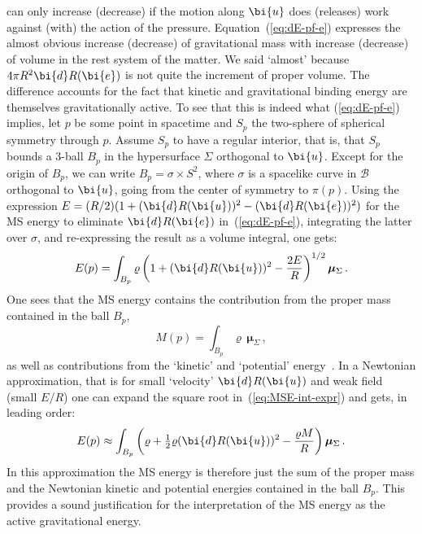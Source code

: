 \documentclass
[rmp,aps,twocolumn,showpacs,preprintnumbers,amsmath,amssymb]{revtex4}
\theoremstyle{plain}
\theoremstyle{definition}
\theoremstyle{remark}
\newcommand{\ed}{\bi{d}}                      %
\newcommand{\B}{\mathcal{B}}                      %
\newcommand{\Stwo}{{S^2}}                         %
\newcommand{\be}{\bi{e}}
\newcommand{\bu}{\bi{u}}
\newcommand{\bmu}{\boldsymbol{\mu}}
\begin{document}
can only increase (decrease) if the motion along $\bu$ does (releases) work 
against (with) the action of the pressure. Equation~(\ref{eq:dE-pf-e}) 
expresses the almost obvious increase (decrease) of gravitational mass 
with increase (decrease) of volume in the rest system of the matter. 
We said `almost' because $4\pi R^2\ed R(\be)$ is not quite the increment 
of proper volume. The difference accounts for the fact that kinetic 
and gravitational binding energy are themselves gravitationally active. 
To see that this is indeed what (\ref{eq:dE-pf-e}) implies, let $p$ 
be some point in spacetime and $S_p$ the two-sphere of spherical symmetry 
through $p$. Assume $S_p$ to have a regular interior, that is, that 
$S_p$ bounds a 3-ball $B_p$ in the hypersurface $\Sigma$ orthogonal 
to $\bu$. Except for the origin of $B_p$, we can write 
$B_p=\sigma\times\Stwo$, where $\sigma$ is a spacelike curve in $\B$ 
orthogonal to $\bu$, going from the center of symmetry to $\pi(p)$. 
Using the expression $E=(R/2)(1 + (\ed R(\bu))^2 - (\ed R(\be))^2)$ 
for the MS energy to eliminate $\ed R(\be)$ in~(\ref{eq:dE-pf-e}), 
integrating the latter over $\sigma$, and re-expressing the result 
as a volume integral, one gets: 
%
\begin{equation}\label{eq:MSE-int-expr}
  E(p) = \int_{B_p} \varrho
         \left( 1 + (\ed R(\bu))^2 - \frac{2E}{R} \right)^{1/2} \bmu_\Sigma\,.
\end{equation}
%
One sees that the MS energy contains the contribution from the 
proper mass contained in the ball $B_p$, 
%
\begin{equation}\label{eq:proper-mass}
  M(p) = \int_{B_p} \varrho\, \bmu_\Sigma \,,
\end{equation}
%
as well as contributions from the `kinetic' and `potential' 
energy~\cite{Misner.Sharp:1964,Hayward:1996}. In a Newtonian approximation, 
that is for small `velocity' $\ed R(\bu)$ and weak field (small $E/R$) one 
can expand the square root in~(\ref{eq:MSE-int-expr}) and gets, in leading 
order:
%
\begin{equation}\label{eq:MSE-int-expr-approx}
  E(p) \approx \int_{B_p}\left( \varrho + \tfrac{1}{2}\varrho(\ed R(\bu))^2 - 
  \frac{\varrho M}{R} \right) \bmu_\Sigma\,.
\end{equation}
%
In this approximation the MS energy is therefore just the sum of the 
proper mass and the Newtonian kinetic and potential energies contained 
in the ball $B_p$. This provides a sound justification for the 
interpretation of the MS energy as the active gravitational energy. 
\end{document}

